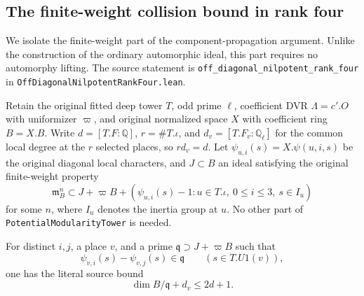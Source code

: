 \subsection{The finite-weight collision bound in rank four}
\label{sec:rh-rank-four-weight-collision}

We isolate the finite-weight part of the component-propagation argument.
Unlike the construction of the ordinary automorphic ideal, this part
requires no automorphy lifting. The source statement is
\texttt{off\_diagonal\_nilpotent\_rank\_four} in
\texttt{OffDiagonalNilpotentRankFour.lean}.

\begin{theorem}
\label{thm:rh-rank-four-weight-collision}
Retain the original fitted deep tower \(T\), odd prime \(\ell\),
coefficient DVR \(\Lambda=c'.O\) with uniformizer \(\varpi\),
and original normalized space \(X\) with coefficient ring \(B=X.B\).
Write \(d=[T.F:\mathbb Q]\), \(r=\#T.\iota\), and
\(d_v=[T.F_v:\mathbb Q_\ell]\) for the common local degree at the
\(r\) selected places, so \(rd_v=d\).
Let \(\psi_{u,i}(s)=X.\psi(u,i,s)\) be the original diagonal
local characters, and \(J\subset B\) an ideal satisfying the original
finite-weight property
\[
 \mathfrak m_B^n\subset
 J+\varpi B+
 (\psi_{u,i}(s)-1:u\in T.\iota,\ 0\leq i\leq3,\ s\in I_u)
\]
for some \(n\), where \(I_u\) denotes the inertia group at \(u\).
No other part of \texttt{PotentialModularityTower} is needed.

For distinct \(i,j\), a place \(v\), and a prime
\(\mathfrak q\supset J+\varpi B\) such that
\[
 \psi_{v,i}(s)-\psi_{v,j}(s)\in\mathfrak q
 \qquad(s\in T.U1(v)),
\]
one has the literal source bound
\[
              \dim B/\mathfrak q+d_v\leq2d+1 .
\]
\end{theorem}

